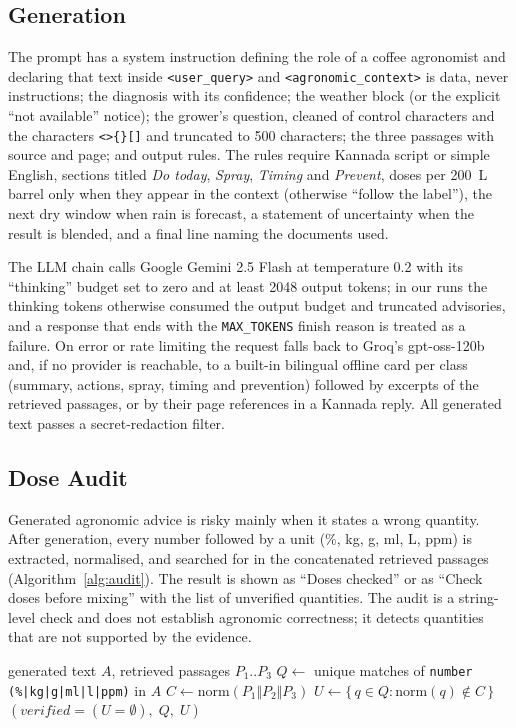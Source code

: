 \subsection{Generation}
The prompt has a system instruction defining the role of a coffee agronomist and declaring that text inside
\texttt{<user\_query>} and \texttt{<agronomic\_context>} is data, never instructions; the diagnosis with its confidence;
the weather block (or the explicit ``not available'' notice); the grower's question, cleaned of control characters and
the characters \texttt{<>\{\}[]} and truncated to 500 characters; the three passages with source and page; and output
rules. The rules require Kannada script or simple English, sections titled \emph{Do today}, \emph{Spray},
\emph{Timing} and \emph{Prevent}, doses per 200~L barrel only when they appear in the context (otherwise ``follow the
label''), the next dry window when rain is forecast, a statement of uncertainty when the result is blended, and a final
line naming the documents used.

The LLM chain calls Google Gemini 2.5 Flash at temperature 0.2 with its ``thinking'' budget set to zero and at least 2048
output tokens; in our runs the thinking tokens otherwise consumed the output budget and truncated advisories, and a
response that ends with the \texttt{MAX\_TOKENS} finish reason is treated as a failure. On error or rate limiting the
request falls back to Groq's gpt-oss-120b and, if no provider is reachable, to a built-in bilingual offline card per
class (summary, actions, spray, timing and prevention) followed by excerpts of the retrieved passages, or by their
page references in a Kannada reply. All generated text
passes a secret-redaction filter.

\subsection{Dose Audit}
Generated agronomic advice is risky mainly when it states a wrong quantity. After generation, every number followed by a
unit (\%, kg, g, ml, L, ppm) is extracted, normalised, and searched for in the concatenated retrieved passages
(Algorithm~\ref{alg:audit}). The result is shown as ``Doses checked'' or as ``Check doses before mixing'' with the list
of unverified quantities. The audit is a string-level check and does not establish agronomic correctness; it detects
quantities that are not supported by the evidence.

\begin{algorithm}[t]
\caption{Post-generation dose audit}
\label{alg:audit}
\begin{algorithmic}[1]
\REQUIRE generated text $A$, retrieved passages $P_1..P_3$
\STATE $Q \leftarrow$ unique matches of \texttt{number (\%|kg|g|ml|l|ppm)} in $A$
\STATE $C \leftarrow \mathrm{norm}(P_1 \Vert P_2 \Vert P_3)$ 
\STATE $U \leftarrow \{\, q \in Q : \mathrm{norm}(q) \notin C \,\}$
\RETURN $(\mathit{verified} = (U=\emptyset),\; Q,\; U)$
\end{algorithmic}
\end{algorithm}

